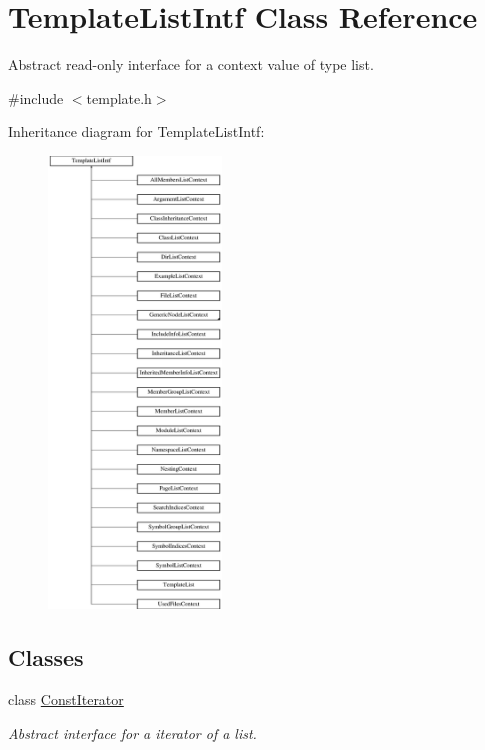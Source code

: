 \hypertarget{class_template_list_intf}{}\section{Template\+List\+Intf Class Reference}
\label{class_template_list_intf}


Abstract read-\/only interface for a context value of type list.  




{\ttfamily \#include $<$template.\+h$>$}

Inheritance diagram for Template\+List\+Intf\+:\begin{figure}[H]
\begin{center}
\leavevmode
\includegraphics[height=12.000000cm]{class_template_list_intf}
\end{center}
\end{figure}
\subsection*{Classes}
\begin{DoxyCompactItemize}
\item 
class \mbox{\hyperlink{class_template_list_intf_1_1_const_iterator}{Const\+Iterator}}
\begin{DoxyCompactList}\small\item\em Abstract interface for a iterator of a list. \end{DoxyCompactList}\end{DoxyCompactItemize}
